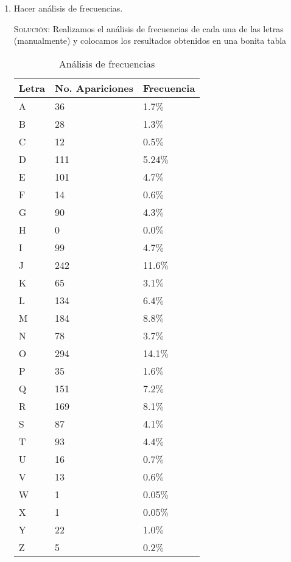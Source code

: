 \documentclass[letterpaper,10pt]{article}
\begin{document}
\begin{enumerate}
    \begin{enumerate}
        \item Hacer análisis de frecuencias.
        
        \textsc{Solución:}
        Realizamos el análisis de frecuencias de cada una de las letras 
        (manualmente) y colocamos los resultados obtenidos en una bonita tabla
        \begin{table}[h]
        \begin{center}
        \begin{tabular}{|l|l|l|}
        \hline
        Letra & No. Apariciones & Frecuencia \\
        \hline 
        A & 36 & 1.7$\%$ \\ \hline
        B & 28 & 1.3$\%$ \\ \hline
        C & 12 & 0.5$\%$ \\ \hline
        D & 111 & 5.24$\%$ \\ \hline
        E & 101 & 4.7$\%$ \\ \hline 
        F & 14 & 0.6$\%$ \\ \hline 
        G & 90 & 4.3$\%$ \\ \hline 
        H & 0 & 0.0$\%$ \\ \hline 
        I & 99 & 4.7$\%$ \\ \hline 
        J & 242 &11.6$\%$ \\ \hline 
        K & 65 & 3.1$\%$ \\ \hline 
        L & 134 & 6.4$\%$ \\ \hline 
        M & 184 & 8.8$\%$ \\ \hline 
        N & 78 & 3.7$\%$ \\ \hline 
        O & 294 & 14.1$\%$ \\ \hline
        P & 35 &1.6$\%$ \\ \hline 
        Q & 151 & 7.2$\%$ \\ \hline 
        R & 169 & 8.1$\%$ \\ \hline 
        S & 87 & 4.1$\%$ \\ \hline 
        T & 93 & 4.4$\%$ \\ \hline 
        U & 16 & 0.7$\%$ \\ \hline 
        V & 13 & 0.6$\%$ \\ \hline 
        W & 1 & 0.05$\%$ \\ \hline 
        X & 1 & 0.05$\%$ \\ \hline 
        Y & 22 & 1.0$\%$ \\ \hline 
        Z & 5 & 0.2$\%$ \\ \hline 
        \end{tabular}
        \caption{Análisis de frecuencias}
        \label{tabla:sencilla}
        \end{center}
        \end{table}
        

\end{enumerate}
\end{enumerate}
\end{document}
